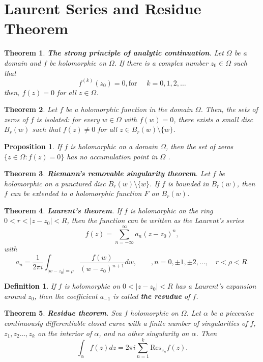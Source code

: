 \documentclass{amsart}
\newtheorem{thm}{Theorem}
\newtheorem{prop}{Proposition}
\newtheorem{mydef}{Definition}
\begin{document}
\section{Laurent Series and Residue Theorem}
\label{sec:org0ad6ed9}

\begin{thm}
\textbf{The strong principle of analytic continuation}. Let \(\Omega\) be a domain and \(f\) be holomorphic on \(\Omega\). If there is a complex number \(z_0\in\Omega\) such that
\[ f^{(k)}(z_0) = 0, \mbox{for }\quad k = 0,1,2,\ldots \]
then, \(f(z) = 0\) for all \(z\in \Omega\).
\end{thm}

\begin{thm}
Let \(f\) be a holomorphic function in the domain \(\Omega\). Then, the sets of zeros of \(f\) is isolated: for every \(w\in \Omega\) with \(f(w) = 0\), there exists a small disc \(B_{r}(w)\) such that \(f(z) \neq 0\) for all \(z\in B_r(w)\setminus \{w\}\).
\end{thm}

\begin{prop}
If \(f\) is holomorphic on a domain  \(\Omega\), then the set of zeros \(\{z \in \Omega : f(z) = 0\}\) has no accumulation point in \(\Omega\) .
\end{prop}

\begin{thm}
\textbf{Riemann's removable singularity theorem}. Let \(f\) be holomorphic on a punctured disc \(B_r(w) \setminus \{w\}\). If \(f\) is bounded in \(B_r(w)\), then \(f\) can be extended to a holomorphic function \(F\) on \(B_r(w)\).
\end{thm}

\begin{thm}
\textbf{Laurent's theorem}. If \(f\) is holomorphic on the ring \(0 < r < |z - z_0| < R\), then the function can be written as the Laurent's series
\[ f(z) = \sum_{n = -\infty}^{\infty} a_n (z - z_0) ^n ,\]
with
\[ a_n = \frac{1}{2\pi i} \int_{|w - z_0| = \rho}\frac{f(w)}{(w - z_0)^{n+1}} dw, \qquad, n = 0, \pm 1, \pm 2, \ldots, \quad r < \rho < R. \]
\end{thm}


\begin{mydef}
If \(f\) is holomorphic on \(0<|z - z_0| < R\) has a Laurent's expansion around \(z_0\), then the coefficient \(a_{-1}\) is called \textbf{the resudue} of \(f\).
\end{mydef}


\begin{thm}
\textbf{Residue theorem}. Sea \(f\) holomorphic on \(\Omega\). Let \(\alpha\) be a piecewise continuously differentiable closed curve with a finite number of singularities of \(f\), \(z_1, z_2 \ldots, z_k\)
on the interior of \(\alpha\), and no other singularity on \(\alpha\). Then
\[ \int_{\alpha}f(z) dz = 2\pi i \sum_{n=1}^k \mbox{Res}_{z_n}f(z). \]
\end{thm}
\end{document}
